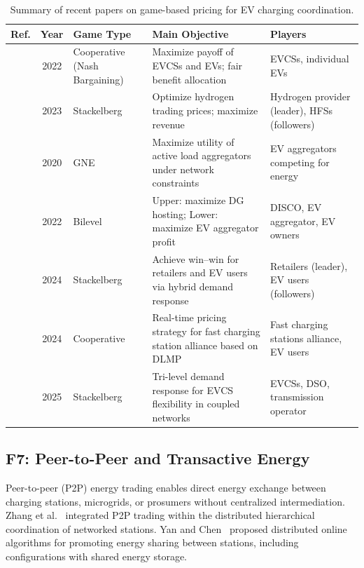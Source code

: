 \documentclass[review]{elsarticle}
\begin{document}
\begin{table}[!htbp]
\centering
\caption{Summary of recent papers on game-based pricing for EV charging coordination.}
\label{tab:game_pricing}
\footnotesize
\begin{tabular}{p{1.5cm}cp{2.5cm}p{4.5cm}p{3.5cm}}
\toprule
\textbf{Ref.} & \textbf{Year} & \textbf{Game Type} & \textbf{Main Objective} & \textbf{Players} \\
\midrule
\cite{affolabi2022optimal} & 2022 & Cooperative (Nash Bargaining) & Maximize payoff of EVCSs and EVs; fair benefit allocation & EVCSs, individual EVs \\
\addlinespace
\cite{guo2023hierarchical} & 2023 & Stackelberg & Optimize hydrogen trading prices; maximize revenue & Hydrogen provider (leader), HFSs (followers) \\
\addlinespace
\cite{wang2020network} & 2020 & GNE & Maximize utility of active load aggregators under network constraints & EV aggregators competing for energy \\
\addlinespace
\cite{najafi2022optimal} & 2022 & Bilevel & Upper: maximize DG hosting; Lower: maximize EV aggregator profit & DISCO, EV aggregator, EV owners \\
\addlinespace
\cite{kazemtarghi2024dynamic} & 2024 & Stackelberg & Achieve win--win for retailers and EV users via hybrid demand response & Retailers (leader), EV users (followers) \\
\addlinespace
\cite{gao2024realtime} & 2024 & Cooperative & Real-time pricing strategy for fast charging station alliance based on DLMP & Fast charging stations alliance, EV users \\
\addlinespace
\cite{qian2025trilevel} & 2025 & Stackelberg & Tri-level demand response for EVCS flexibility in coupled networks & EVCSs, DSO, transmission operator \\
\bottomrule
\end{tabular}
\end{table}



\subsection{F7: Peer-to-Peer and Transactive Energy}\label{sec:f7}

\hspace{0.5cm}Peer-to-peer (P2P) energy trading enables direct energy exchange between charging stations, microgrids, or prosumers without centralized intermediation. Zhang et al.~\cite{zhang2022distributed} integrated P2P trading within the distributed hierarchical coordination of networked stations. Yan and Chen~\cite{yan2023distributed,yan2023coordination} proposed distributed online algorithms for promoting energy sharing between stations, including configurations with shared energy storage.
\end{document}
